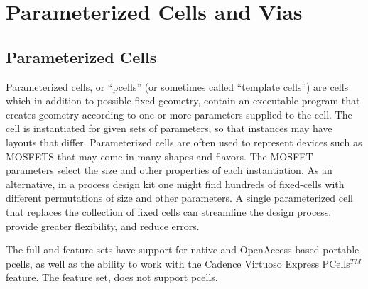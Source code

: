 
\chapter{Parameterized Cells and Vias}

\section{Parameterized Cells}
\label{pcells}

Parameterized cells, or ``pcells'' (or sometimes called ``template
cells'') are cells which in addition to possible fixed geometry,
contain an executable program that creates geometry according to one
or more parameters supplied to the cell.  The cell is instantiated for
given sets of parameters, so that instances may have layouts that
differ.  Parameterized cells are often used to represent devices such
as MOSFETS that may come in many shapes and flavors.  The MOSFET
parameters select the size and other properties of each instantiation. 
As an alternative, in a process design kit one might find hundreds of
fixed-cells with different permutations of size and other parameters. 
A single parameterized cell that replaces the collection of fixed
cells can streamline the design process, provide greater flexibility,
and reduce errors.

The full and {\XicII} feature sets have support for native and
OpenAccess-based portable pcells, as well as the ability to work with
the Cadence Virtuoso Express PCells$^{TM}$ feature.  The {\Xiv}
feature set, does not support pcells.

